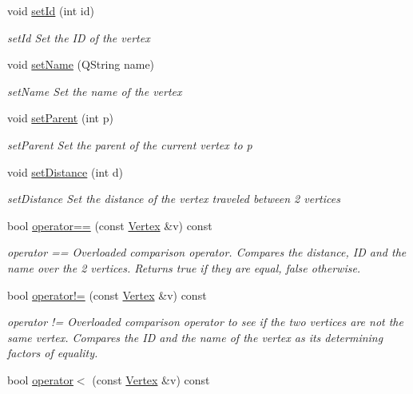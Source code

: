 \begin{DoxyCompactItemize}
void \hyperlink{class_vertex_a0b766cc3ce251348af422c0773bb4359}{set\+Id} (int id)
\begin{DoxyCompactList}\small\item\em set\+Id Set the ID of the vertex \end{DoxyCompactList}\item 
void \hyperlink{class_vertex_a19650c9cd9e30c07897b70781bee3e31}{set\+Name} (Q\+String name)
\begin{DoxyCompactList}\small\item\em set\+Name Set the name of the vertex \end{DoxyCompactList}\item 
void \hyperlink{class_vertex_aeecd5db632f599376c1bfa3737348434}{set\+Parent} (int p)
\begin{DoxyCompactList}\small\item\em set\+Parent Set the parent of the current vertex to p \end{DoxyCompactList}\item 
void \hyperlink{class_vertex_a020868955e2e501f13bd4f5b6d1d5a23}{set\+Distance} (int d)
\begin{DoxyCompactList}\small\item\em set\+Distance Set the distance of the vertex traveled between 2 vertices \end{DoxyCompactList}\item 
bool \hyperlink{class_vertex_a7f1217525ed5dffeeebc7201d4827e7c}{operator==} (const \hyperlink{class_vertex}{Vertex} \&v) const 
\begin{DoxyCompactList}\small\item\em operator == Overloaded comparison operator. Compares the distance, ID and the name over the 2 vertices. Returns true if they are equal, false otherwise. \end{DoxyCompactList}\item 
bool \hyperlink{class_vertex_ae704d41fe2ff1316201b85c5ec2d7d5b}{operator!=} (const \hyperlink{class_vertex}{Vertex} \&v) const 
\begin{DoxyCompactList}\small\item\em operator != Overloaded comparison operator to see if the two vertices are not the same vertex. Compares the ID and the name of the vertex as its determining factors of equality. \end{DoxyCompactList}\item 
bool \hyperlink{class_vertex_a82b7bdf14f62f4a0e13dce7f33f9713d}{operator$<$} (const \hyperlink{class_vertex}{Vertex} \&v) const 

\end{DoxyCompactItemize}
